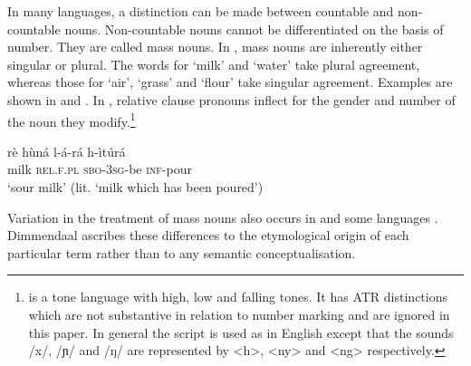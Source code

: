 \documentclass[output=paper]{langsci/langscibook}
\begin{document}
In many languages, a distinction can be made between countable and non-countable nouns. Non-countable nouns cannot be differentiated on the basis of number. They are called mass nouns. In , mass nouns are inherently either singular or plural.  The words for ‘milk’ and ‘water’ take plural agreement, whereas those for ‘air’, ‘grass’ and ‘flour’ take singular agreement. Examples are shown in  and . In , relative clause pronouns inflect for the gender and number of the noun they modify.\footnote{ is a tone language with high, low and falling tones. It has ATR distinctions which are not substantive in relation to number marking and are ignored in this paper. In general the  script is used as in English except that the sounds /x/, /ɲ/ and /ŋ/ are represented by <h>, <ny> and <ng> respectively.}

\ea\label{ex:moodie:1}
\gll rè hùná l-á-rá h-ìtúrá \\
milk \textsc{rel.f.pl} \textsc{sbo-3sg}-be \textsc{inf}-pour \\
\glt ‘sour milk’ (lit. ‘milk which has been poured’)
\z

\ea\label{ex:moodie:2}

\z
\z

Variation in the treatment of mass nouns also occurs in  \citep[224]{Dimmendaal1983} and some  languages \citep[173]{Corbett2000}. Dimmendaal ascribes these differences to the etymological origin of each particular term \citep[230]{Dimmendaal2000} rather than to any semantic conceptualisation.
\end{document}

